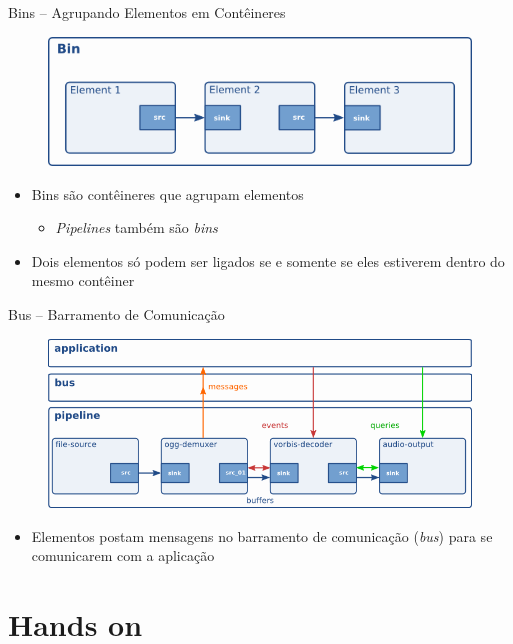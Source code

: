 \documentclass{beamer}
\def\en#1{\foreignlanguage{english}{\emph{#1}}}
\begin{document}
\begin{frame}[c]{Bins -- Agrupando Elementos em Contêineres}
  \begin{figure}
    \centering
    \includegraphics[scale=0.5]{figs/bin}
  \end{figure}

  \begin{itemize}
    \item Bins são contêineres que agrupam elementos
      \begin{itemize}
        \item \en{Pipelines} também são \en{bins}
      \end{itemize}
    \item Dois elementos só podem ser ligados se e somente se eles estiverem
      dentro do mesmo contêiner
  \end{itemize}
\end{frame}

\begin{frame}[c]{Bus -- Barramento de Comunicação}
  \begin{figure}
    \centering
    \includegraphics[scale=0.5]{figs/bus}
  \end{figure}

  \begin{itemize}
    \item Elementos postam mensagens no barramento de comunicação (\en{bus})
      para se comunicarem com a aplicação
  \end{itemize}
\end{frame}

\section{Hands on}
\end{document}

